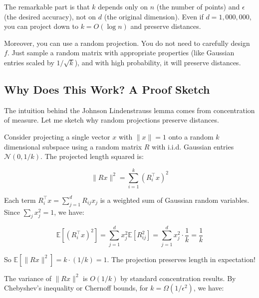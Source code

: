 The remarkable part is that $k$ depends only on $n$ (the number of points) and $\epsilon$ (the desired accuracy), not on $d$ (the original dimension). Even if $d = 1{,}000{,}000$, you can project down to $k = O(\log n)$ and preserve distances.

\vspace{1em}

Moreover, you can use a random projection. You do not need to carefully design $f$. Just sample a random matrix with appropriate properties (like Gaussian entries scaled by $1/\sqrt{k}$), and with high probability, it will preserve distances.

\vspace{1.5em}

\subsection{Why Does This Work? A Proof Sketch}

The intuition behind the Johnson Lindenstrauss lemma comes from concentration of measure. Let me sketch why random projections preserve distances.

\vspace{1em}

Consider projecting a single vector $x$ with $\|x\| = 1$ onto a random $k$ dimensional subspace using a random matrix $R$ with i.i.d. Gaussian entries $\mathcal{N}(0, 1/k)$. The projected length squared is:

\begin{equation}
\|Rx\|^2 = \sum_{i=1}^k (R_i^\top x)^2
\end{equation}

Each term $R_i^\top x = \sum_{j=1}^d R_{ij} x_j$ is a weighted sum of Gaussian random variables. Since $\sum_j x_j^2 = 1$, we have:

\begin{equation}
\mathbb{E}[(R_i^\top x)^2] = \sum_{j=1}^d x_j^2 \mathbb{E}[R_{ij}^2] = \sum_{j=1}^d x_j^2 \cdot \frac{1}{k} = \frac{1}{k}
\end{equation}

So $\mathbb{E}[\|Rx\|^2] = k \cdot (1/k) = 1$. The projection preserves length in expectation!

\vspace{1em}

The variance of $\|Rx\|^2$ is $O(1/k)$ by standard concentration results. By Chebyshev's inequality or Chernoff bounds, for $k = \Omega(1/\epsilon^2)$, we have:

